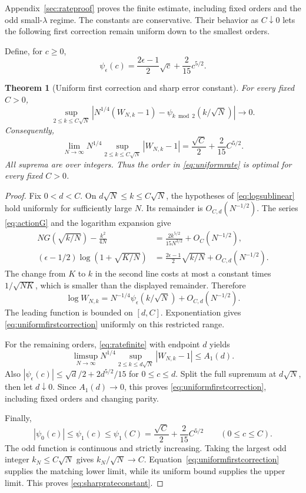 \documentclass[11pt]{article}
\newtheorem{theorem}{Theorem}[section]
\theoremstyle{definition}
\theoremstyle{remark}
\newcommand{\1}{\mathbf 1}
\begin{document}
Appendix~\ref{sec:rateproof} proves the finite estimate, including fixed orders and the odd small-$\lambda$ regime. The constants are conservative. Their behavior as $C\downarrow0$ lets the following first correction remain uniform down to the smallest orders.

Define, for $c\ge0$,
\begin{equation}\label{eq:ratepsi}
\psi_\epsilon(c)=\frac{2\epsilon-1}{2}\sqrt c+\frac{2}{15}c^{5/2}.
\end{equation}

\begin{theorem}[Uniform first correction and sharp error constant]\label{thm:firstcorrection}
For every fixed $C>0$,
\begin{equation}\label{eq:uniformfirstcorrection}
\sup_{2\le k\le C\sqrt N}
\left|N^{1/4}(W_{N,k}-1)-\psi_{k\bmod2}(k/\sqrt N)\right|
\longrightarrow0.
\end{equation}
Consequently,
\begin{equation}\label{eq:sharprateconstant}
\lim_{N\to\infty}N^{1/4}
\sup_{2\le k\le C\sqrt N}|W_{N,k}-1|
=\frac{\sqrt C}{2}+\frac{2}{15}C^{5/2}.
\end{equation}
All suprema are over integers. Thus the order in \eqref{eq:uniformrate} is optimal for every fixed $C>0$.
\end{theorem}
\begin{proof}
Fix $0<d<C$. On $d\sqrt N\le k\le C\sqrt N$, the hypotheses of \eqref{eq:logsublinear} hold uniformly for sufficiently large $N$. Its remainder is $O_{C,d}(N^{-1/2})$. The series \eqref{eq:actionG} and the logarithm expansion give
\begin{align*}
NG(\sqrt{k/N})-\frac{k^2}{4N}
&=\frac{2k^{5/2}}{15N^{3/2}}+O_C(N^{-1/2}),\\
(\epsilon-1/2)\log(1+\sqrt{K/N})
&=\frac{2\epsilon-1}{2}\sqrt{k/N}+O_{C,d}(N^{-1/2}).
\end{align*}
The change from $K$ to $k$ in the second line costs at most a constant times $1/\sqrt{NK}$, which is smaller than the displayed remainder. Therefore
\[
\log W_{N,k}
=N^{-1/4}\psi_\epsilon(k/\sqrt N)+O_{C,d}(N^{-1/2}).
\]
The leading function is bounded on $[d,C]$. Exponentiation gives \eqref{eq:uniformfirstcorrection} uniformly on this restricted range.

For the remaining orders, \eqref{eq:ratefinite} with endpoint $d$ yields
\[
\limsup_{N\to\infty}N^{1/4}
\sup_{2\le k\le d\sqrt N}|W_{N,k}-1|\le A_1(d).
\]
Also $|\psi_\epsilon(c)|\le\sqrt d/2+2d^{5/2}/15$ for $0\le c\le d$. Split the full supremum at $d\sqrt N$, then let $d\downarrow0$. Since $A_1(d)\to0$, this proves \eqref{eq:uniformfirstcorrection}, including fixed orders and changing parity.

Finally,
\[
|\psi_0(c)|\le\psi_1(c)\le\psi_1(C)
=\frac{\sqrt C}{2}+\frac{2}{15}C^{5/2}
\qquad(0\le c\le C).
\]
The odd function is continuous and strictly increasing. Taking the largest odd integer $k_N\le C\sqrt N$ gives $k_N/\sqrt N\to C$. Equation~\eqref{eq:uniformfirstcorrection} supplies the matching lower limit, while its uniform bound supplies the upper limit. This proves \eqref{eq:sharprateconstant}.
\end{proof}
\end{document}
